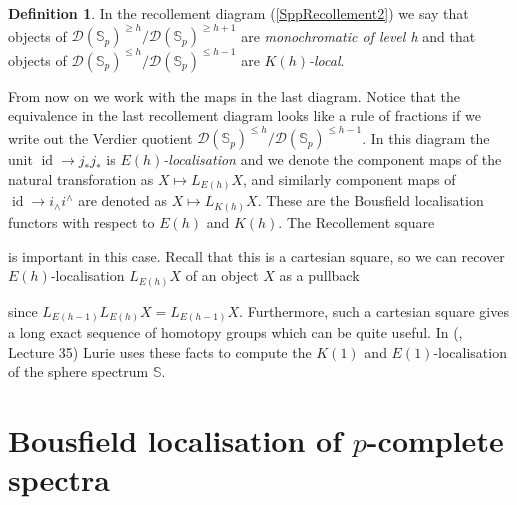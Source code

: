 \documentclass[a4paper]{article} %
\theoremstyle{definition}
\newtheorem{definition}[theorem]{Definition}
\newcommand{\Sph}{\mathbb{S}}
\newcommand{\Spp}{\mathcal{D}(\mathbb{S}_p)}
\begin{document}
\begin{definition}
In the recollement diagram (\ref{SppRecollement2}) we say that objects of $\Spp^{\ge h}/\Spp^{\ge h+1}$ are \textit{monochromatic of level h} and that objects of $\Spp^{\le h}/\Spp^{\le h-1}$ are $K(h)$\textit{-local}.
\end{definition}
From now on we work with the maps in the last diagram. Notice that the equivalence in the last recollement diagram looks like a rule of fractions if we write out the Verdier quotient $\Spp^{\le h} / \Spp^{\le h -1}$. In this diagram the unit $\operatorname{id} \to j_*j_*$ is $E(h)$\textit{-localisation} and we denote the component maps of the natural transforation as $X \mapsto L_{E(h)}X$, and similarly component maps of $\operatorname{id} \to i_\wedge i^\wedge$ are denoted as $X \mapsto L_{K(h)}X$. These are the Bousfield localisation functors with respect to $E(h)$ and $K(h)$. The Recollement square
\begin{center}
\end{center}
is important in this case. Recall that this is a cartesian square, so we can recover $E(h)$-localisation $L_{E(h)}X$ of an object $X$ as a pullback
\begin{center}
\end{center}
since $L_{E(h-1)}L_{E(h)}X = L_{E(h-1)}X$. Furthermore, such a cartesian square gives a long exact sequence of homotopy groups which can be quite useful. In (\cite{luriechromatichomotopytheorynotes}, Lecture 35) Lurie uses these facts to compute the $K(1)$ and $E(1)$-localisation of the sphere spectrum $\Sph$.

\section{Bousfield localisation of $p$-complete spectra}\label{Section:bousfieldlocal}
\end{document}

